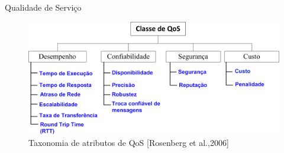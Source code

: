 \documentclass[xcolor=svgnames]{beamer}
\begin{document}
    \begin{frame}{Qualidade de Serviço}
      \begin{figure}[!h]
          \centering
          \includegraphics[width=1.0\textwidth]{QoSTaxonomy.png}
          \caption{Taxonomia de atributos de QoS [Rosenberg et al.,2006] } %
      \end{figure}	

      \tiny{
      }
    \end{frame}
\end{document}
